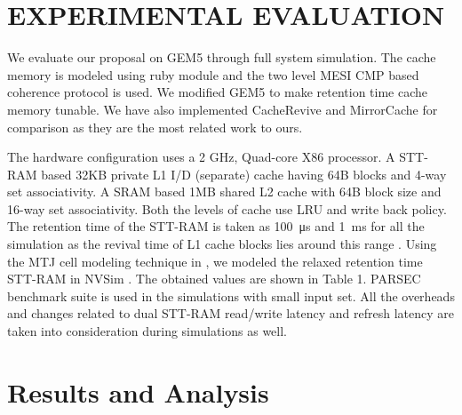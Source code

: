 \documentclass[sigconf]{acmart}
\begin{document}
\section{EXPERIMENTAL EVALUATION}
We evaluate our proposal on GEM5\cite{gem5} through full system simulation. The cache memory is modeled using ruby module and the two level MESI CMP based coherence protocol is used. We modified GEM5 to make retention time cache memory tunable. We have also implemented CacheRevive \cite{cache_revive} and MirrorCache \cite{mirror_cache} for comparison as they are the most related work to ours.

The hardware configuration uses a 2 GHz, Quad-core X86 processor. A STT-RAM based 32KB private L1 I/D (separate) cache having 64B blocks and 4-way set associativity. A SRAM based 1MB shared L2 cache with 64B block size and 16-way set associativity. Both the levels of cache use LRU and write back policy. The retention time of the STT-RAM is taken as \SI{100}{\micro\second} and \SI{1}{\milli\second} for all the simulation as the revival time of L1 cache blocks lies around this range \cite{liang}. Using the MTJ cell modeling technique in \cite{stt_ram}, we modeled the relaxed retention time STT-RAM in NVSim \cite{nvsim}. The obtained values are shown in Table 1. PARSEC \cite{parsec} benchmark suite is used in the simulations with small input set. All the overheads and changes related to dual STT-RAM read/write latency and refresh latency are taken into consideration during simulations as well.

\section{ Results and Analysis}
\end{document}
